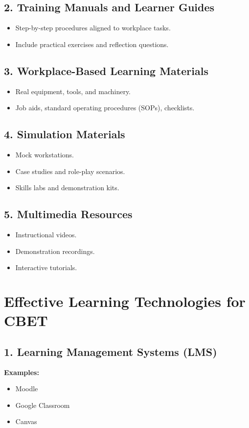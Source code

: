\documentclass[12pt,a4paper]{article}
\begin{document}
\subsection*{2. Training Manuals and Learner Guides}
\begin{itemize}
    \item Step-by-step procedures aligned to workplace tasks.
    \item Include practical exercises and reflection questions.
\end{itemize}

\subsection*{3. Workplace-Based Learning Materials}
\begin{itemize}
    \item Real equipment, tools, and machinery.
    \item Job aids, standard operating procedures (SOPs), checklists.
\end{itemize}

\subsection*{4. Simulation Materials}
\begin{itemize}
    \item Mock workstations.
    \item Case studies and role-play scenarios.
    \item Skills labs and demonstration kits.
\end{itemize}

\subsection*{5. Multimedia Resources}
\begin{itemize}
    \item Instructional videos.
    \item Demonstration recordings.
    \item Interactive tutorials.
\end{itemize}

\section*{Effective Learning Technologies for CBET}

\subsection*{1. Learning Management Systems (LMS)}
\textbf{Examples:}
\begin{itemize}
    \item Moodle
    \item Google Classroom
    \item Canvas
\end{itemize}
\end{document}
